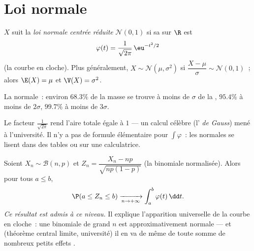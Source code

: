 \section{Loi normale}

\begin{definition}\label{def:g12:contdist:normal}
$X$ suit la \emph{loi normale centrée réduite}
$\mathcal N(0, 1)$ si sa  sur $\R$ est
\[
\varphi(t) = \frac{1}{\sqrt{2\pi}}\,\eu^{-t^2/2}
\]
(la courbe en cloche). Plus généralement,
$X \sim \mathcal N(\mu, \sigma^2)$ si $\dfrac{X - \mu}{\sigma} \sim
\mathcal N(0,1)$~; alors $\E(X) = \mu$ et $\V(X) = \sigma^2$.
\end{definition}

\begin{omfigure}

{\small La  normale~: environ $68.3\%$ de la masse se trouve à
moins de $\sigma$ de la , $95.4\%$ à moins de $2\sigma$, $99.7\%$ à
moins de $3\sigma$.}
\end{omfigure}

\begin{remark}
Le facteur $\frac{1}{\sqrt{2\pi}}$ rend l'aire totale égale à $1$ --- un
calcul célèbre (l'\emph{ de Gauss}) mené à l'université. Il n'y a
pas de formule élémentaire pour $\int \varphi$~: les  normales
se lisent dans des tables ou sur une calculatrice.
\end{remark}

\begin{theorem}\label{thm:g12:contdist:tcl}
Soient $X_n \sim \mathcal B(n, p)$ et
$Z_n = \dfrac{X_n - np}{\sqrt{np(1-p)}}$ (la binomiale normalisée). Alors
pour tous $a \leq b$,
\[
\P(a \leq Z_n \leq b) \xrightarrow[n\to+\infty]{}
\int_a^b \varphi(t)\,\dd t .
\]
\emph{Ce résultat est admis à ce niveau.} Il explique l'apparition
universelle de la courbe en cloche~: une binomiale de grand $n$ est
approximativement normale --- et (théorème central limite, université) il
en va de même de toute somme de nombreux petits effets .
\end{theorem}

